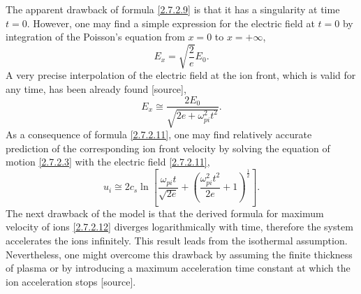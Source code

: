 The apparent drawback of formula \ref{2.7.2.9} is that it has a singularity at time $ t = 0 $. However, one may find a simple expression for the electric field at $ t = 0 $ by integration of the Poisson's equation from $ x = 0 $ to $ x = +\infty $,
\begin{equation}
\label{2.7.2.10}
E_x = \sqrt{\frac{2}{e}} E_0.
\end{equation}
A very precise interpolation of the electric field at the ion front, which is valid for any time, has been already found [source],
\begin{equation}
\label{2.7.2.11}
E_x \cong \frac{2 E_0}{\sqrt{2e + \omega_{pi}^2 t^2}}.
\end{equation}
As a consequence of formula \ref{2.7.2.11}, one may find relatively accurate prediction of the corresponding ion front velocity by solving the equation of motion \ref{2.7.2.3} with the electric field \ref{2.7.2.11},
\begin{equation}
\label{2.7.2.12}
u_i \cong 2 c_s \ln \left[ \frac{\omega_{pi} t}{\sqrt{2 e}} + \left(\frac{\omega_{pi}^2 t^2}{2 e} + 1 \right)^{\frac{1}{2}} \right].
\end{equation}
The next drawback of the model is that the derived formula for maximum velocity of ions \ref{2.7.2.12} diverges logarithmically with time, therefore the system accelerates the ions infinitely. This result leads from the isothermal assumption. Nevertheless, one might overcome this drawback by assuming the finite thickness of plasma or by introducing a maximum acceleration time constant at which the ion acceleration stops [source].